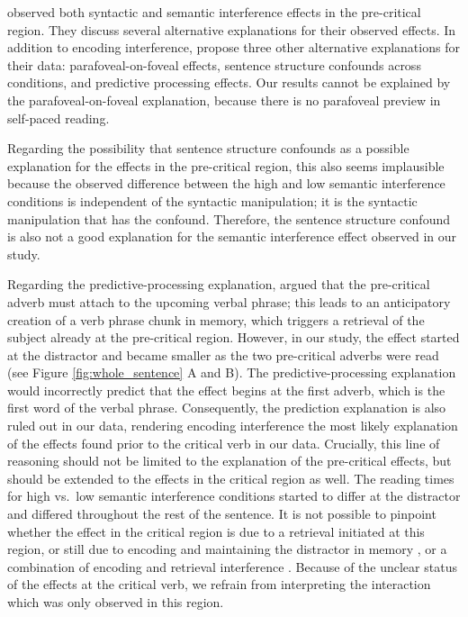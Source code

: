 \documentclass[a4paper, man, floatsintext]{apa7}
\begin{document}
\textcite{mertzen} observed both syntactic and semantic interference effects in the pre-critical region. 
They discuss several alternative explanations for their observed effects. In addition to encoding interference, \textcite{mertzen} propose three other alternative explanations for their data: parafoveal-on-foveal effects, sentence structure confounds across conditions, and predictive processing effects. Our results cannot be explained by the parafoveal-on-foveal explanation, because there is no parafoveal preview in self-paced reading. 

Regarding the possibility that sentence structure confounds as a possible explanation for the effects in the pre-critical region, this also seems implausible because the observed difference between the high and low semantic interference conditions is independent of the syntactic manipulation; it is the syntactic manipulation that has the confound. Therefore, the sentence structure confound is also not a good explanation for the semantic interference effect observed in our study. 

Regarding the predictive-processing explanation, \citet{mertzen} argued that the pre-critical adverb must attach to the upcoming verbal phrase; this leads to an anticipatory creation of a verb phrase chunk in memory, which triggers a retrieval of the subject already at the pre-critical region. However, in our study, the effect started at the distractor and became smaller as the two pre-critical adverbs were read (see Figure \ref{fig:whole_sentence} A and B). The predictive-processing explanation would incorrectly predict that the effect begins at the first adverb, which is the first word of the verbal phrase. Consequently, the prediction explanation is also ruled out in our data, rendering encoding interference the most likely explanation of the effects found prior to the critical verb in our data. Crucially, this line of reasoning should not be limited to the explanation of the pre-critical effects, but should be extended to the effects in the critical region as well. The reading times for high vs.\ low semantic interference conditions started to differ at the distractor and differed throughout the rest of the sentence. It is not possible to pinpoint whether the effect in the critical region is due to a retrieval initiated at this region, or still due to encoding and maintaining the distractor in memory \citep{ness2017}, or a combination of encoding and retrieval interference \parencite{Yadavetal2022}. Because of the unclear status of the effects at the critical verb, we refrain from interpreting the interaction which was only observed in this region. 
\end{document}
